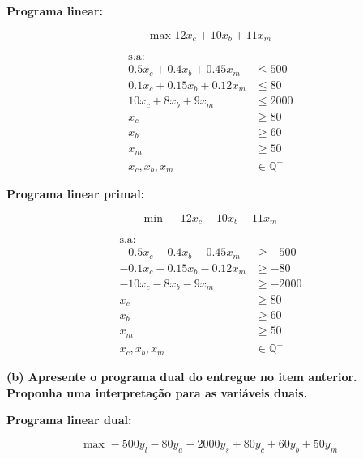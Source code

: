 \documentclass[
    12pt,
    a4paper,
    brazil,
    english
]{article}
\begin{document}
\textbf{Programa linear:}

\begin{equation}
    \text{max } 12x_c + 10x_b + 11x_m
\end{equation}

\begin{align}
    \text{s.a:} \nonumber \\
    0.5x_c + 0.4x_b + 0.45x_m &\leq 500 \\
    0.1x_c + 0.15x_b + 0.12x_m &\leq 80 \\
    10x_c + 8x_b + 9x_m &\leq 2000 \\
    x_c &\geq 80 \\
    x_b &\geq 60 \\
    x_m &\geq 50 \\
    x_c, x_b, x_m &\in \mathbb{Q}^+
\end{align}

\textbf{Programa linear primal:}

\begin{equation}
    \text{min } -12x_c - 10x_b - 11x_m
\end{equation}

\begin{align}
    \text{s.a:} \nonumber \\
    -0.5x_c - 0.4x_b - 0.45x_m &\geq -500 \\
    -0.1x_c - 0.15x_b - 0.12x_m &\geq -80 \\
    -10x_c - 8x_b - 9x_m &\geq -2000 \\
    x_c &\geq 80 \\
    x_b &\geq 60 \\
    x_m &\geq 50 \\
    x_c, x_b, x_m &\in \mathbb{Q}^+
\end{align}

\textbf{(b) Apresente o programa dual do entregue no item anterior. Proponha uma interpretação para as variáveis
duais.}

\textbf{Programa linear dual:}

\vspace{0.5cm}

\begin{equation}
    \text{max } -500y_l - 80y_a - 2000y_s +80y_c + 60y_b + 50y_m
\end{equation}
\end{document}

